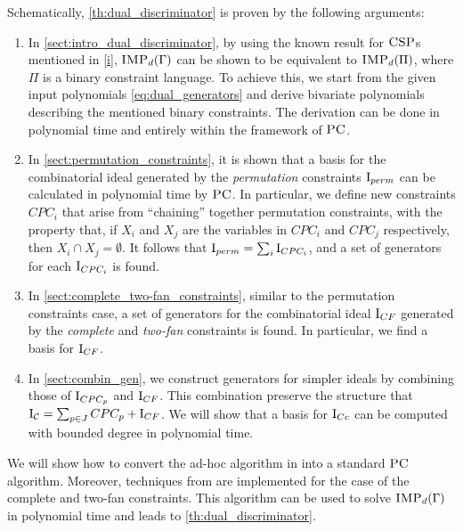 \documentclass[11pt]{article}
\newcommand{\Cc}{\mathcal{C}}
\newcommand{\CSP}{\textsc{CSP}}
\newcommand{\IMP}{\textsc{IMP}}
\newcommand{\PC}{\textsc{PC}}
\newcommand{\I}{\emph{$\rm{I}$}}
\newcommand{\1}{\textbf{1}}
\newcommand{\GB}{\text{Gr\"{o}bner} }
\begin{document}
{Schematically, \cref{th:dual_discriminator} is proven by the following arguments:}
%
\begin{enumerate}
    \item In \cref{sect:intro_dual_discriminator}, by using the known result for $\CSP$s mentioned in \ref{i}, $\IMP_d(\Gamma)$ can be shown to be equivalent to $\IMP_{d}(\Pi)$, where $\Pi$ is a binary constraint language. To achieve this, we start from the given input polynomials \eqref{eq:dual_generators} and derive bivariate polynomials describing the mentioned binary constraints. The derivation can be done in polynomial time and entirely within the framework of $\PC$. 
    \item In \cref{sect:permutation_constraints}, it is shown that a \GB basis for the combinatorial ideal generated by the \textit{permutation} constraints $\I_{perm}$ can be calculated in polynomial time by $\PC$. In particular, we define new constraints $CPC_i$ that arise from ``chaining'' together permutation constraints, with the property that, if $X_i$ and $X_j$ are the variables in $CPC_i$ and $CPC_j$ respectively, then $X_i \cap X_j = \emptyset$. It follows that $\I_{perm} = \sum_i \I_{CPC_i}$, and a set of generators for each $\I_{CPC_i}$ is found.
    \item In \cref{sect:complete_two-fan_constraints}, similar to the permutation constraints case, a set of generators for the combinatorial ideal $\I_{CF}$ generated by the \textit{complete} and \textit{two-fan} constraints is found. In particular, we find a \GB basis for $\I_{CF}$.
    \item In \cref{sect:combin_gen}, we construct generators for simpler ideals by combining those of $\I_{CPC_p}$ and $\I_{CF}$. This combination preserve the structure that $\I_{\Cc} = \sum_{p \in J} CPC_p + \I_{CF}$. We will show that a \GB basis for $\I_{Cc}$ can be computed with bounded degree in polynomial time.
\end{enumerate}

We will show how to convert the ad-hoc algorithm in \cite{BharathiM21, BharathiM25} into a standard $\PC$ algorithm. Moreover, techniques from \cite{BulatovRSTOC22} are implemented for the case of the complete and two-fan constraints. This algorithm can be used to solve $\IMP_d(\Gamma)$ in polynomial time and leads to \cref{th:dual_discriminator}.
\end{document}
